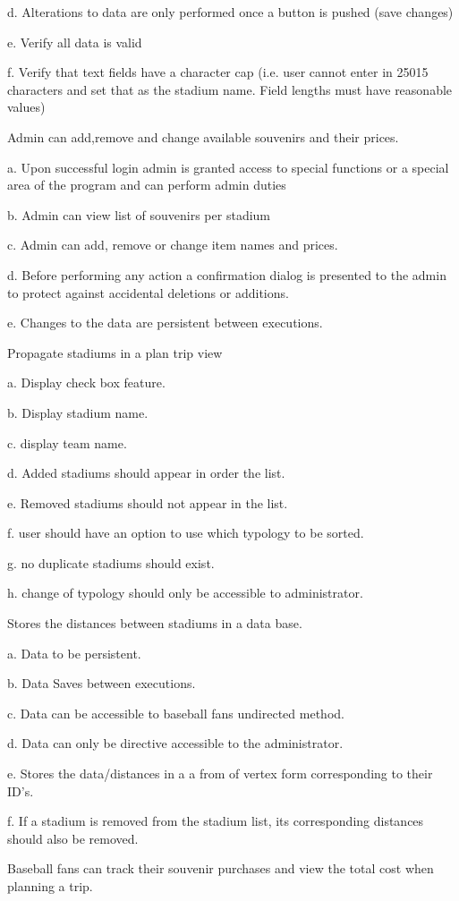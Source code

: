 \begin{DoxyEnumerate}
d. Alterations to data are only performed once a button is pushed (save changes)

e. Verify all data is valid

f. Verify that text fields have a character cap (i.\+e. user cannot enter in 25015 characters and set that as the stadium name. Field lengths must have reasonable values)
\item Admin can add,remove and change available souvenirs and their prices.

a. Upon successful login admin is granted access to special functions or a special area of the program and can perform admin duties

b. Admin can view list of souvenirs per stadium

c. Admin can add, remove or change item names and prices.

d. Before performing any action a confirmation dialog is presented to the admin to protect against accidental deletions or additions.

e. Changes to the data are persistent between executions.
\item Propagate stadiums in a plan trip view

a. Display check box feature.

b. Display stadium name.

c. display team name.

d. Added stadiums should appear in order the list.

e. Removed stadiums should not appear in the list.

f. user should have an option to use which typology to be sorted.

g. no duplicate stadiums should exist.

h. change of typology should only be accessible to administrator.
\item Stores the distances between stadiums in a data base.

a. Data to be persistent.

b. Data Saves between executions.

c. Data can be accessible to baseball fans undirected method.

d. Data can only be directive accessible to the administrator.

e. Stores the data/distances in a a from of vertex form corresponding to their I\+D’s.

f. If a stadium is removed from the stadium list, its corresponding distances should also be removed.
\item Baseball fans can track their souvenir purchases and view the total cost when planning a trip.


\end{DoxyEnumerate}
